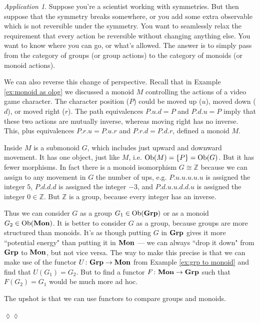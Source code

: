 \documentclass{book}
\def\tn{\textnormal}
\def\ZZ{{\mathbb Z}}
\def\Ob{\tn{Ob}}
\def\to{\rightarrow}
\def\taking{\colon}
\def\iso{\cong}
\def\Mon{{\bf Mon}}
\def\Grp{{\bf Grp}}
\theoremstyle{remark}
\newtheorem{app}[subsubsection]{Application}
\newenvironment{application}{\begin{app}}{\hspace*{\fill}$\lozenge\lozenge$\end{app}}
\theoremstyle{definition}
\begin{document}
\begin{application}

Suppose you're a scientist working with symmetries. But then suppose that the symmetry breaks somewhere, or you add some extra observable which is not reversible under the symmetry. You want to seamlessly relax the requirement that every action be reversible without changing anything else. You want to know where you can go, or what's allowed. The answer is to simply pass from the category of groups (or group actions) to the category of monoids (or monoid actions). 

We can also reverse this change of perspective. Recall that in Example \ref{ex:monoid as olog} we discussed a monoid $M$ controlling the actions of a video game character. The character position ($P$) could be moved up ($u$), moved down ($d$), or moved right ($r$). The path equivalences $P.u.d=P$ and $P.d.u=P$ imply that these two actions are mutually inverse, whereas moving right has no inverse. This, plus equivalences $P.r.u=P.u.r$ and $P.r.d=P.d.r$, defined a monoid $M$. 

Inside $M$ is a submonoid $G$, which includes just upward and downward movement. It has one object, just like $M$, i.e. $\Ob(M)=\{P\}=\Ob(G)$. But it has fewer morphisms. In fact there is a monoid isomorphism $G\iso\ZZ$ because we can assign to any movement in $G$ the number of ups, e.g. $P.u.u.u.u.u$ is assigned the integer $5$, $P.d.d.d$ is assigned the integer $-3$, and $P.d.u.u.d.d.u$ is assigned the integer $0\in\ZZ$. But $\ZZ$ is a group, because every integer has an inverse.

Thus we can consider $G$ as a group $G_1\in\Ob(\Grp)$ or as a monoid $G_2\in\Ob(\Mon)$. It is better to consider $G$ as a group, because groups are more structured than monoids. It's as though putting $G$ in $\Grp$ gives it more ``potential energy" than putting it in $\Mon$ --- we can always ``drop it down" from $\Grp$ to $\Mon$, but not vice versa. The way to make this precise is that we can make use of the functor $U\taking\Grp\to\Mon$ from Example \ref{ex:grp to monoid} and find that $U(G_1)=G_2$. But to find a functor $F\taking\Mon\to\Grp$ such that $F(G_2)=G_1$ would be much more ad hoc. 

The upshot is that we can use functors to compare groups and monoids.

\end{application}
\end{document}
